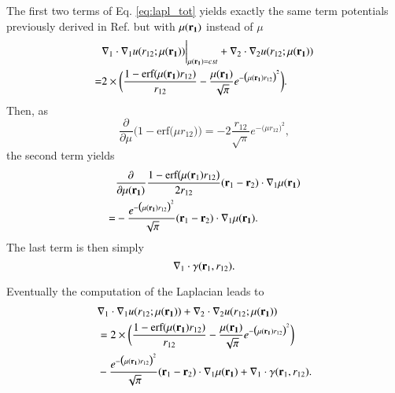\documentclass[aip,jcp,reprint,noshowkeys,superscriptaddress]{revtex4-1}
\newcommand{\deriv}[3]{\frac{\partial^{#3} #1}{\partial {#2}^{#3}}}
\newcommand{\br}[0]{{\bf {r}}}
\newcommand{\bri}[1]{{\bf r}_{#1}}
\newcommand{\mur}[1]{\mu({\bf r_{#1}})}
\begin{document}
The first two terms of Eq. \eqref{eq:lapl_tot} yields exactly the same term potentials previously derived in Ref. \cite{Gin-JCP-21} but with $\mur{1}$ instead of $\mu$
\begin{equation}
 \begin{aligned}
 & \nabla_1 \cdot \nabla_1 u(r_{12};\mur{1})\bigg|_{\mur{1}=cst} + \nabla_2 \cdot \nabla_2 u(r_{12};\mur{1})  \\ 
 =& 2 \times \bigg( \frac{1 - \text{erf}(\mur{1} r_{12})}{r_{12}} - \frac{\mur{1}}{\sqrt{\pi}} e^{-\big(\mur{1} r_{12} \big)^2}  \bigg).
 \end{aligned}
\end{equation}
Then, as 
\begin{equation}
 \deriv{}{\mu}{} \bigg(1 - \text{erf}\big(\mu r_{12} \big) \bigg) = - 2 \frac{r_{12}}{\sqrt{\pi}} e^{-\big( \mu r_{12}\big)^2},
\end{equation}
the second term yields 
\begin{equation}
 \begin{aligned}
 & \deriv{}{\mur{1}}{}\frac{1 - \text{erf}\big(\mu(\bri{1}) r_{12} \big)}{2 r_{12}} (\br_1 - \br_2) \cdot \nabla_1 \mur{1} \\
=& -\frac{e^{-\big( \mur{1} r_{12}\big)^2}}{\sqrt{\pi}}(\br_1 - \br_2) \cdot \nabla_1 \mur{1}. 
 \end{aligned}
\end{equation}
The last term is then simply
\begin{equation}
 \nabla_1 \cdot {\bf \gamma}(\br_1, r_{12}). 
\end{equation}

Eventually the computation of the Laplacian leads to 
\begin{equation}
 \begin{aligned}
 &\nabla_1 \cdot \nabla_1 u(r_{12};\mur{1}) + \nabla_2 \cdot \nabla_2 u(r_{12};\mur{1}) \\ 
 & =  2 \times \bigg( \frac{1 - \text{erf}(\mur{1} r_{12})}{r_{12}} - \frac{\mur{1}}{\sqrt{\pi}} e^{-\big(\mur{1} r_{12} \big)^2}  \bigg) \\
 & -\frac{e^{-\big( \mur{1} r_{12}\big)^2}}{\sqrt{\pi}}(\br_1 - \br_2) \cdot \nabla_1 \mur{1} + \nabla_1 \cdot {\bf \gamma}(\br_1, r_{12}).
 \end{aligned}
\end{equation}
\end{document}
